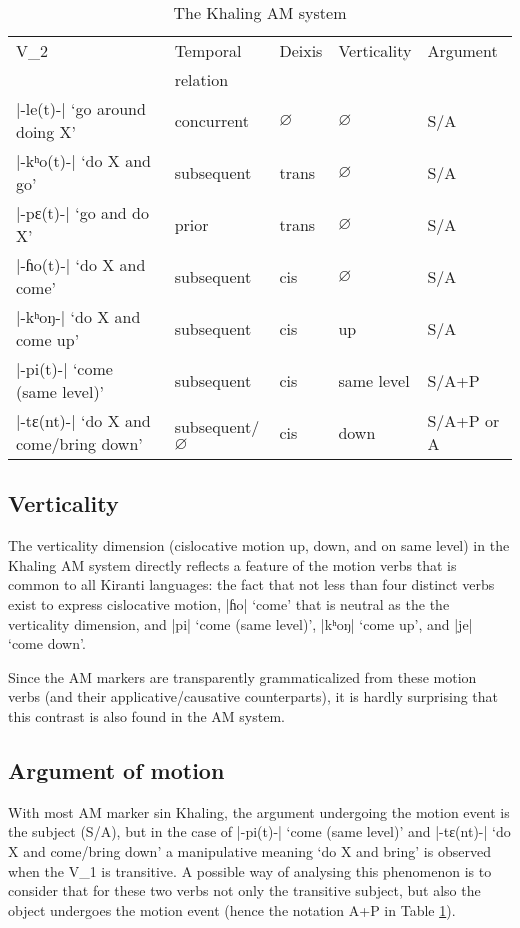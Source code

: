 \documentclass[oneside,a4paper,11pt]{article}
\newcommand{\ipa}[1]{{\phon#1}}
\newcommand{\dhatu}[2]{|\ipa{#1}| `#2'}
\begin{document}
\begin{table}[H]
\caption{The Khaling AM system} \label{tab:system} \centering
\begin{tabular}{lllll}
\toprule
V_2 & Temporal & Deixis & Verticality & Argument \\
& relation \\
\midrule
\dhatu{-le(t)-}{go around doing X} &concurrent& $\varnothing$ & $\varnothing$ & S/A \\
\dhatu{-kʰo(t)-}{do X and go} &subsequent& trans & $\varnothing$ & S/A \\
\dhatu{-pɛ(t)-}{go and do X} &prior& trans & $\varnothing$ & S/A \\
\dhatu{-ɦo(t)-}{do X and come} &subsequent& cis & $\varnothing$ & S/A \\
\dhatu{-kʰoŋ-}{do X and come up} &subsequent& cis &up & S/A \\
 \dhatu{-pi(t)-}{come (same level)} &subsequent& cis &same level & S/A+P \\
  \dhatu{-tɛ(nt)-}{do X and come/bring down} &subsequent/$\varnothing$ & cis &down & S/A+P or A \\
\bottomrule
\end{tabular}
\end{table}

 \subsection{Verticality} \label{sec:verticality}
 The verticality dimension (cislocative motion up, down, and on same level) in the Khaling AM system directly reflects a feature of the motion verbs that is common to all Kiranti languages: the fact that not less than four distinct verbs exist to express cislocative motion, \dhatu{ɦo}{come} that is neutral as the the verticality dimension, and \dhatu{pi}{come (same level)}, \dhatu{kʰoŋ}{come up}, and \dhatu{je}{come down}. 
 
 Since the AM markers are transparently grammaticalized from these motion verbs (and their applicative/causative counterparts), it is hardly surprising that this contrast is also found in the AM system.
 
  \subsection{Argument of motion} \label{sec:argument}
With most AM marker sin Khaling, the argument undergoing the motion event is the subject (S/A), but in the case of  \dhatu{-pi(t)-}{come (same level)} and   \dhatu{-tɛ(nt)-}{do X and come/bring down} a manipulative meaning `do X and bring' is observed when the V_1 is transitive. A possible way of analysing this phenomenon is to consider that for these two verbs not only the transitive subject, but also the object undergoes the motion event (hence the notation A+P in Table \ref{tab:system}).
\end{document}
